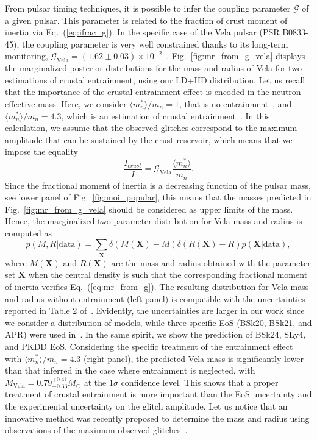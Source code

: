 From pulsar timing techniques, it is possible to infer the coupling parameter 
$\mathcal{G}$ of a given pulsar. This parameter is related to the fraction
of crust moment of inertia via Eq.~(\ref{eq:ifrac_g}). In the specific case of 
the Vela pulsar (PSR B0833-45), the coupling parameter is very well 
constrained thanks to its long-term monitoring, 
$\mathcal{G}_{\text{Vela}}=(1.62\pm 0.03)\times 10^{-2}$~\cite{Ho2015}.
Fig.~\ref{fig:mr_from_g_vela} displays the marginalized posterior distributions
for the mass and radius of Vela for two estimations of crustal entrainment,
using our LD+HD distribution.
Let us recall that the importance of the crustal entrainment effect is encoded 
in the neutron effective mass. Here, we consider $\langle m_n^* \rangle/m_n 
= 1$, that is no entrainment~\cite{Link1999}, and 
$\langle m_n^*\rangle/m_n = 4.3$, which is an estimation of crustal
entrainment~\cite{Andersson2012}. 
In this calculation, we assume that the observed glitches correspond to the 
maximum amplitude that can be sustained by the crust reservoir, which means 
that we impose the equality
%
\begin{equation}
  \frac{I_{crust}}{I} = \mathcal{G}_{\text{Vela}}\frac{\langle
  m_n^*\rangle}{m_n}.\label{eq:mr_from_g}
\end{equation}
%
Since the fractional moment of inertia is a decreasing function of the pulsar
mass, see lower panel of Fig.~\ref{fig:moi_popular}, this means that the masses 
predicted in Fig.~\ref{fig:mr_from_g_vela} should be considered as upper limits 
of the mass. 
Hence, the marginalized two-parameter distribution for Vela mass and radius is 
computed as
%
\begin{equation}
  p(M,R|\text{data})=
  \sum_{\bm{X}}\delta(M(\bm{X})-M)\delta(R(\bm{X})-R)
  p(\bm{X}|\text{data}),
\end{equation}
%
where $M(\bm{X})$ and $R(\bm{X})$ are the mass and radius obtained with the
parameter set $\bm{X}$ when the central density is such that the corresponding
fractional moment of inertia verifies Eq.~(\ref{eq:mr_from_g}). 
The resulting distribution for Vela mass and radius without entrainment (left
panel) is compatible with the uncertainties reported in Table 2 
of~\cite{Ho2015}. Evidently, the uncertainties are larger in our work since we 
consider a distribution of models, while three specific EoS (BSk20, BSk21, and 
APR) were used in~\cite{Ho2015}. In the same spirit, we show the prediction of 
BSk24, SLy4, and PKDD EoS. Considering the specific treatment of the
entrainment effect with $\langle m_n^*\rangle/m_n = 4.3$ (right panel), the 
predicted Vela mass is significantly lower than that inferred in the case where
entrainment is neglected, with $M_{\text{Vela}}=0.79_{-0.33}^{+0.41} M_\odot$ 
at the $1\sigma$ confidence level. This shows that a proper treatment of 
crustal entrainment is more important than the EoS uncertainty and the
experimental uncertainty on the glitch amplitude.
Let us notice that an innovative method was recently proposed to determine the 
mass and radius using observations of the maximum observed
glitches~\cite{Pizzochero2017}.

